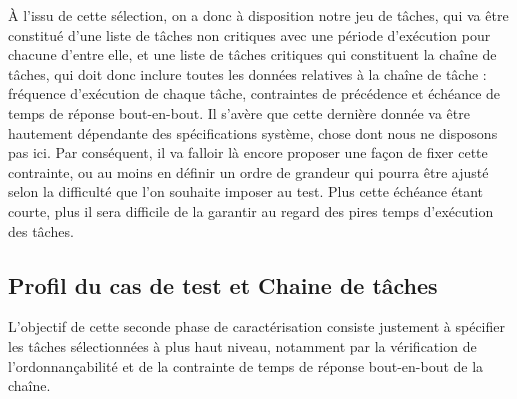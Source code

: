 \documentclass[french, a4paper, 11pt, twoside, pdftex]{StyleThese}
\begin{document}
    		À l'issu de cette sélection, on a donc à disposition notre jeu de tâches, qui va être constitué d'une liste de tâches non critiques avec une période d'exécution pour chacune d'entre elle, et une liste de tâches critiques qui constituent la chaîne de tâches, qui doit donc inclure toutes les données relatives à la chaîne de tâche : fréquence d'exécution de chaque tâche, contraintes de précédence et échéance de temps de réponse bout-en-bout. 
    		Il s'avère que cette dernière donnée va être hautement dépendante des spécifications système, chose dont nous ne disposons pas ici. Par conséquent, il va falloir là encore proposer une façon de fixer cette contrainte, ou au moins en définir un ordre de grandeur qui pourra être ajusté selon la difficulté que l'on souhaite imposer au test. Plus cette échéance étant courte, plus il sera difficile de la garantir au regard des pires temps d'exécution des tâches. 
    		
                    
    \subsection{Profil du cas de test et Chaine de tâches}
    
L'objectif de cette seconde phase de caractérisation consiste justement à spécifier les tâches sélectionnées à plus haut niveau, notamment par la vérification de l'ordonnançabilité et de la contrainte de temps de réponse bout-en-bout de la chaîne.
\end{document}
